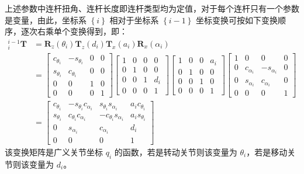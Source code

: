 \documentclass[cn,11pt,chinese,blue,bibstyle=ieeetr]{elegantbook}
\begin{document}
上述参数中连杆扭角、连杆长度即连杆类型均为定值，对于每个连杆只有一个参数是变量，由此，坐标系 $\left\{i\right\}$ 相对于坐标系 $\left\{i-1\right\}$ 坐标变换可按如下变换顺序，逐次右乘单个变换得到，即：
\begin{equation}\label{sdh_model_adjacent_link_forward_coordinate_transformation}
	\begin{aligned}
		{_i^{i-1}\bm{T}} &= \bm{R}_z\left(\theta_i\right)\bm{T}_z\left(d_i\right)\bm{T}_x\left(a_i\right)\bm{R}_x\left(\alpha_i\right) \\
		&= 
		\begin{bmatrix}
			c_{\theta_i} & -s_{\theta_i} & 0 & 0 \\
			s_{\theta_i} & c_{\theta_i}  & 0 & 0 \\
			0         & 0          & 1 & 0 \\
			0         & 0          & 0 & 1
		\end{bmatrix}
		\begin{bmatrix}
			1 & 0 & 0 & 0   \\
			0 & 1 & 0 & 0   \\
			0 & 0 & 1 & d_i \\
			0 & 0 & 0 & 1
		\end{bmatrix}
		\begin{bmatrix}
			1 & 0 & 0 & a_i \\
			0 & 1 & 0 & 0   \\
			0 & 0 & 1 & 0   \\
			0 & 0 & 0 & 1
		\end{bmatrix}
		\begin{bmatrix}
			1 & 0 		  & 0          & 0 \\
			0 & c_{\alpha_i} & -s_{\alpha_i} & 0 \\
			0 & s_{\alpha_i} & c_{\alpha_i}  & 0 \\
			0 & 0         & 0          & 1
		\end{bmatrix} \\
		&= \begin{bmatrix}
			c_{\theta_i} & -s_{\theta_i} c_{\alpha_i} & s_{\theta_i} s_{\alpha_i}  & a_i c_{\theta_i} \\
			s_{\theta_i} & c_{\theta_i} c_{\alpha_i}  & -c_{\theta_i} s_{\alpha_i} & a_i s_{\theta_i} \\
			0         & s_{\alpha_i}            & c_{\alpha_i}            & d_i           \\
			0         & 0                    & 0                    & 1
		\end{bmatrix}
	\end{aligned}
\end{equation}
该变换矩阵是广义关节坐标 $q_i$ 的函数，若是转动关节则该变量为 $\theta_i$，若是移动关节则该变量为 $d_i$。
\end{document}
